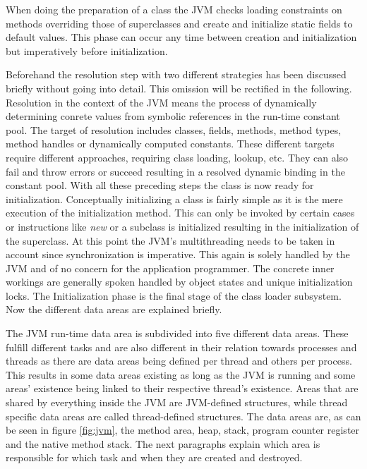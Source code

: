 When doing the preparation of a class the JVM checks loading constraints on methods overriding those of superclasses and create and initialize static fields to default values. This phase can occur any time between creation and initialization but imperatively before initialization.

Beforehand the resolution step with two different strategies has been discussed briefly without going into detail. This omission will be rectified in the following. Resolution in the context of the JVM means the process of dynamically determining conrete values from symbolic references in the run-time constant pool. The target of resolution includes classes, fields, methods, method types, method handles or dynamically computed constants. These different targets require different approaches, requiring class loading, lookup, etc. They can also fail and throw errors or succeed resulting in a resolved dynamic binding in the constant pool. With all these preceding steps the class is now ready for initialization.
Conceptually initializing a class is fairly simple as it is the mere execution of the initialization method. This can only be invoked by certain cases or instructions like \emph{new} or a subclass is initialized resulting in the initialization of the superclass. At this point the JVM's multithreading needs to be taken in account since synchronization is imperative. This again is solely handled by the JVM and of no concern for the application programmer. The concrete inner workings are generally spoken handled by object states and unique initialization locks. The Initialization phase is the final stage of the class loader subsystem. Now the different data areas are explained briefly. \cite{Lindholm}

The JVM run-time data area is subdivided into five different data areas. These fulfill different tasks and are also different in their relation towards processes and threads as there are data areas being defined per thread and others per process. This results in some data areas existing as long as the JVM is running and some areas' existence being linked to their respective thread's existence. Areas that are shared by everything inside the JVM are JVM-defined structures, while thread specific data areas are called thread-defined structures. The data areas are, as can be seen in figure \ref{fig:jvm}, the method area, heap, stack, program counter register and the native method stack. The next paragraphs explain which area is responsible for which task and when they are created and destroyed.

